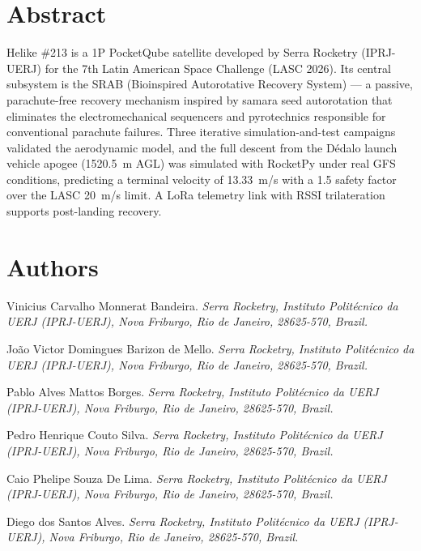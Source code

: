 \section*{Abstract}

Helike \#213 is a 1P PocketQube satellite developed by Serra Rocketry
(IPRJ-UERJ) for the 7th Latin American Space Challenge (LASC 2026).
Its central subsystem is the SRAB (Bioinspired Autorotative Recovery
System) --- a passive, parachute-free recovery mechanism inspired by
samara seed autorotation that eliminates the electromechanical
sequencers and pyrotechnics responsible for conventional parachute
failures. Three iterative simulation-and-test campaigns validated the
aerodynamic model, and the full descent from the Dédalo launch vehicle
apogee (1520.5~m AGL) was simulated with RocketPy under real GFS
conditions, predicting a terminal velocity of 13.33~m/s with a 1.5
safety factor over the LASC 20~m/s limit. A LoRa telemetry link with
RSSI trilateration supports post-landing recovery.

\section*{Authors}
\noindent Vinicius Carvalho Monnerat Bandeira. \emph{Serra Rocketry, Instituto
Politécnico da UERJ (IPRJ-UERJ), Nova Friburgo, Rio de Janeiro, 28625-570,
Brazil.}

\noindent João Victor Domingues Barizon de Mello. \emph{Serra Rocketry, Instituto
Politécnico da UERJ (IPRJ-UERJ), Nova Friburgo, Rio de Janeiro, 28625-570,
Brazil.}

\noindent Pablo Alves Mattos Borges. \emph{Serra Rocketry, Instituto Politécnico da
UERJ (IPRJ-UERJ), Nova Friburgo, Rio de Janeiro, 28625-570, Brazil.}

\noindent Pedro Henrique Couto Silva. \emph{Serra Rocketry, Instituto Politécnico da
UERJ (IPRJ-UERJ), Nova Friburgo, Rio de Janeiro, 28625-570, Brazil.}

\noindent Caio Phelipe Souza De Lima. \emph{Serra Rocketry, Instituto Politécnico da
UERJ (IPRJ-UERJ), Nova Friburgo, Rio de Janeiro, 28625-570, Brazil.}

\noindent Diego dos Santos Alves. \emph{Serra Rocketry, Instituto Politécnico da UERJ
(IPRJ-UERJ), Nova Friburgo, Rio de Janeiro, 28625-570, Brazil.}

